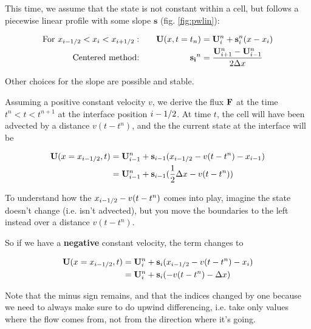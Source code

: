 This time, we assume that the state is not constant within a cell, but follows a piecewise linear profile with some slope $\mathbf{s}$ (fig. \ref{fig:pwlin}):

\begin{align*}
	\text{For } x_{i-1/2} < x_i < x_{i+1/2}: &&
	\quad \mathbf{U}(x, t=t_n) &= \mathbf{U}_i^n + \mathbf{s}_i^n(x - x_i) \\
	\text{Centered method:} && \mathbf{s_i}^n &= \frac{\mathbf{U}_{i+1}^n - \mathbf{U}_{i-1}^n}{ 2 \Delta x}
\end{align*}

Other choices for the slope are possible and stable.




Assuming a positive constant velocity $v$, we derive the flux $\mathbf{F}$ at the time $t^n < t < t^{n+1}$ at the interface position $i-1/2$.
At time $t$, the cell will have been advected by a distance $v (t - t^n)$, and the the current state at the interface will be

\begin{align*}
	\mathbf{U}(x=x_{i-1/2}, t) 
		&= \mathbf{U}_{i-1}^n + \mathbf{s}_{i-1} (x_{i-1/2} - v (t - t^n) - x_{i-1}) \\
		&= \mathbf{U}_{i-1}^n + \mathbf{s}_{i-1} (\frac{1}{2} \Delta x - v (t - t^n))
\end{align*}

To understand how the $x_{i-1/2} - v (t - t^n)$ comes into play, imagine the state doesn't change (i.e. isn't advected), but you move the boundaries to the left instead over a distance $v(t - t^n)$.

So if we have a \textbf{negative} constant velocity, the term changes to 

\begin{align*}
	\mathbf{U}(x=x_{i-1/2}, t) 
		&= \mathbf{U}_{i}^n + \mathbf{s}_{i} (x_{i-1/2} - v (t - t^n) - x_{i}) \\
		&= \mathbf{U}_{i}^n + \mathbf{s}_{i} (-v (t - t^n) - \Delta x)
\end{align*}



Note that the minus sign remains, and that the indices changed by one because we need to always make sure to do upwind differencing, i.e. take only values where the flow comes from, not from the direction where it's going.

